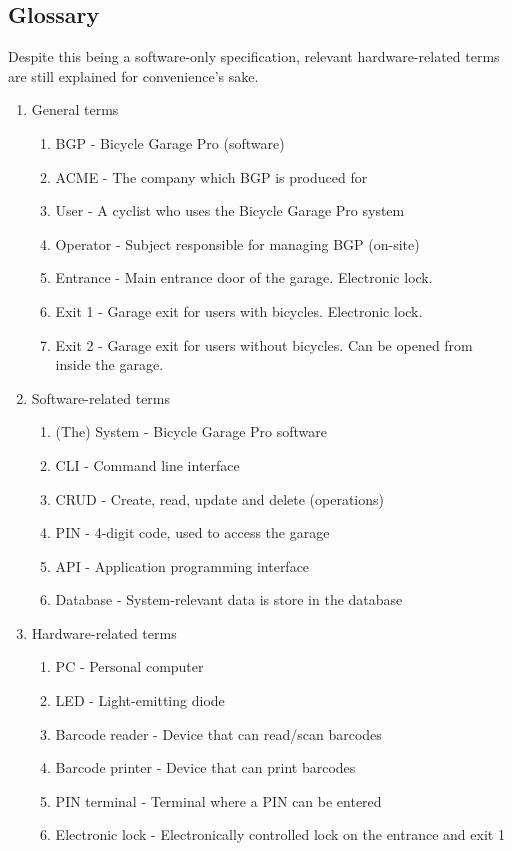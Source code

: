 \documentclass[12pt,titlepage,bibliography=totoc]{article}
\begin{document}
\subsection{Glossary}
Despite this being a software-only specification, relevant hardware-related terms are still explained for convenience's sake.
\begin{enumerate}
	\item General terms
	\begin{enumerate}
		\item BGP - Bicycle Garage Pro (software)
		\item ACME - The company which BGP is produced for
		\item User - A cyclist who uses the Bicycle Garage Pro system
		\item Operator - Subject responsible for managing BGP (on-site)
		\item Entrance - Main entrance door of the garage. Electronic lock.
		\item Exit 1 - Garage exit for users with bicycles. Electronic lock.
		\item Exit 2 - Garage exit for users without bicycles. Can be opened from inside the garage.
	\end{enumerate}

	\item Software-related terms
	\begin{enumerate}
		\item (The) System - Bicycle Garage Pro software
		\item CLI - Command line interface
		\item CRUD - Create, read, update and delete (operations)
		\item PIN - 4-digit code, used to access the garage
		\item API - Application programming interface
		\item Database - System-relevant data is store in the database
	\end{enumerate}

	\item Hardware-related terms
	\begin{enumerate}
		\item PC - Personal computer
		\item LED - Light-emitting diode
		\item Barcode reader - Device that can read/scan barcodes
		\item Barcode printer - Device that can print barcodes
		\item PIN terminal - Terminal where a PIN can be entered
		\item Electronic lock - Electronically controlled lock on the entrance and exit 1
	\end{enumerate}
\end{enumerate}
\end{document}
